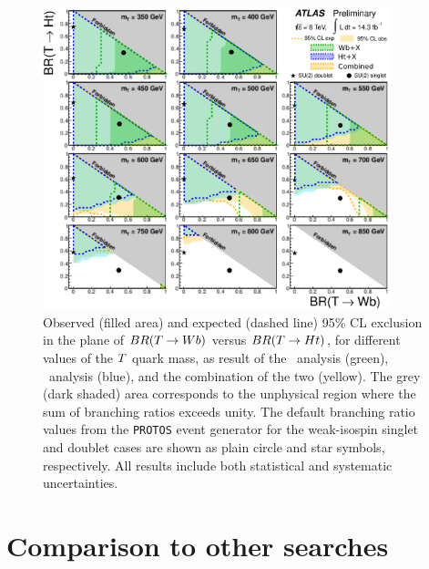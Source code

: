 \begin{figure}[h!bt]
\centering
\includegraphics[width=0.9\textwidth]{results/figures/combinationoverlap.eps}
\caption{
Observed (filled area) and expected (dashed line) 95\% CL exclusion in the plane of
$BR(\T \to Wb)$ versus $BR(\T \to Ht)$, for different values of the $\T$ quark mass,
as result of the \wbx\ analysis (green), \htx\ analysis (blue), and the combination of the two (yellow).
The grey (dark shaded) area corresponds to the unphysical region where the sum of branching ratios exceeds unity. 
The default branching ratio values from the \texttt{PROTOS} event generator for the weak-isospin singlet and doublet cases 
are shown as plain circle and star symbols, respectively. All results
include both statistical and systematic uncertainties.
\label{fig:limits2D_potentialcombo}}
\end{figure}

\section{Comparison to other searches}\label{sec:coverage}

